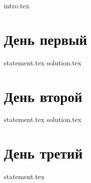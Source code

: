{intro.tex}

\section{День первый}
{statement.tex}
{solution.tex}

\section{День второй}
{statement.tex}
{solution.tex}

\section{День третий}
{statement.tex}